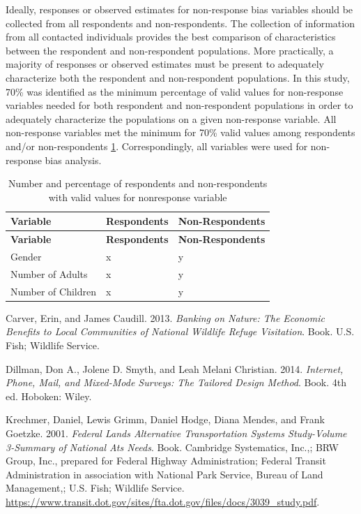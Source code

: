 \documentclass[]{book}
\begin{document}
Ideally, responses or observed estimates for non-response bias variables
should be collected from all respondents and non-respondents. The
collection of information from all contacted individuals provides the
best comparison of characteristics between the respondent and
non-respondent populations. More practically, a majority of responses or
observed estimates must be present to adequately characterize both the
respondent and non-respondent populations. In this study, 70\% was
identified as the minimum percentage of valid values for non-response
variables needed for both respondent and non-respondent populations in
order to adequately characterize the populations on a given non-response
variable. All non-response variables met the minimum for 70\% valid
values among respondents and/or non-respondents \ref{tab:nonresponse}.
Correspondingly, all variables were used for non-response bias analysis.

\begin{longtable}[]{@{}lll@{}}
\caption{\label{tab:nonresponse} Number and percentage of respondents and
non-respondents with valid values for nonresponse
variable}\tabularnewline
\toprule
\textbf{Variable} & \textbf{Respondents} &
\textbf{Non-Respondents}\tabularnewline
\midrule
\endfirsthead
\toprule
\textbf{Variable} & \textbf{Respondents} &
\textbf{Non-Respondents}\tabularnewline
\midrule
\endhead
Gender & x & y\tabularnewline
Number of Adults & x & y\tabularnewline
Number of Children & x & y\tabularnewline
\bottomrule
\end{longtable}

\hypertarget{refs}{}
\hypertarget{ref-carver2013}{}
Carver, Erin, and James Caudill. 2013. \emph{Banking on Nature: The
Economic Benefits to Local Communities of National Wildlife Refuge
Visitation}. Book. U.S. Fish; Wildlife Service.

\hypertarget{ref-dillman2014}{}
Dillman, Don A., Jolene D. Smyth, and Leah Melani Christian. 2014.
\emph{Internet, Phone, Mail, and Mixed-Mode Surveys: The Tailored Design
Method}. Book. 4th ed. Hoboken: Wiley.

\hypertarget{ref-krechmer2001}{}
Krechmer, Daniel, Lewis Grimm, Daniel Hodge, Diana Mendes, and Frank
Goetzke. 2001. \emph{Federal Lands Alternative Transportation Systems
Study-Volume 3-Summary of National Ats Needs}. Book. Cambridge
Systematics, Inc.,; BRW Group, Inc., prepared for Federal Highway
Administration; Federal Transit Administration in association with
National Park Service, Bureau of Land Management,; U.S. Fish; Wildlife
Service.
\url{https://www.transit.dot.gov/sites/fta.dot.gov/files/docs/3039_study.pdf}.
\end{document}
